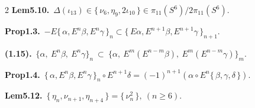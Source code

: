 \documentclass[10pt, leqno]{ltjsarticle}
\newcommand{\Ex}{E}        %
\newcommand{\toda}[1]{\{\,#1\,\}}              %
\newcommand{\todai}[2][]{\{\,#2\,\}_{#1}}      %
\newcommand{\gen}[1]{\{\,#1\,\}}       %
\numberwithin{equation}{section}
\theoremstyle{plain}
\theoremstyle{definition}
\theoremstyle{remark}
\begin{document}
\begin{paracol}{2}
\noindent
\textbf{Lem5.10.}\
\(
\Delta(\iota_{13})\in\toda{\nu_6,\eta_9,2\iota_{10}}\in\pi_{11}(S^6)/2\pi_{11}(S^6) .
\)

\noindent
\textbf{Prop1.3.}\
\(-E\todai[n]{\alpha, E^n\beta, E^n\gamma}
\subset \todai[n+1]{E\alpha, E^{n+1}\beta, E^{n+1}\gamma}\).

\noindent
\textbf{(1.15).}\
\(\{\alpha,\ \Ex^n\beta,\ \Ex^n\gamma\}_n
\ \subset\
\bigl\{\alpha,\ \Ex^{m}(E^{n-m}\beta),\ E^{m}(E^{n-m}\gamma)\bigr\}_m .\)

\noindent
\textbf{Prop1.4.}\
\(\todai[n]{\alpha, E^n\beta, E^n\gamma}\circ E^{n+1}\delta
= (-1)^{n+1}(\alpha\circ E^n\toda{\beta, \gamma, \delta})\).

\noindent
\textbf{Lem5.12.}\
\(\toda{\eta_n,\nu_{n+1},\eta_{n+4}} = \gen{\nu_n^2},\ (n\geq6) .\)





\end{paracol}
\end{document}
